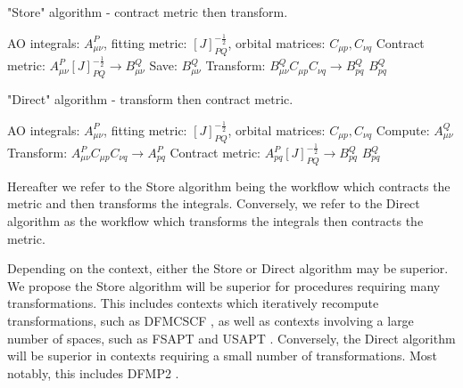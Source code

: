 \begin{algorithm}[H]
\caption{"Store" algorithm - contract metric then transform.}
\begin{algorithmic}
\REQUIRE AO integrals: $A_{\mu \nu}^P$, fitting metric: $[J]_{PQ}^{-\frac{1}{2}}$, orbital matrices: $C_{\mu p}, C_{\nu q}$
\STATE Contract metric: $A_{\mu \nu}^P [J]_{PQ}^{-\frac{1}{2}} \rightarrow B_{\mu \nu}^Q$
\STATE Save: $B_{\mu \nu}^Q$
    \STATE Transform: $B_{\mu \nu}^QC_{\mu p}C_{\nu q} \rightarrow B_{p q}^Q$
\ENDFOR
\RETURN $B_{p q}^Q$
\end{algorithmic}
\end{algorithm}

\begin{algorithm}[H]
\caption{"Direct" algorithm - transform then contract metric.}
\begin{algorithmic}
\REQUIRE AO integrals: $A_{\mu \nu}^P$, fitting metric: $[J]_{PQ}^{-\frac{1}{2}}$, orbital matrices: $C_{\mu p}, C_{\nu q}$
\STATE Compute: $A_{\mu \nu}^Q$
    \STATE Transform: $A_{\mu \nu}^PC_{\mu p}C_{\nu q} \rightarrow A_{p q}^P$
    \STATE Contract metric: $A_{p q}^P [J]_{PQ}^{-\frac{1}{2}} \rightarrow B_{p q}^Q$
\ENDFOR
\RETURN $B_{p q}^Q$
\end{algorithmic}
\end{algorithm}

\noindent Hereafter we refer to the Store algorithm being the workflow which contracts the metric and then transforms the integrals. Conversely, 
we refer to the Direct algorithm as the workflow which transforms the integrals then contracts the metric. 

Depending on the context, either the Store or Direct algorithm may be superior. We propose the Store algorithm 
will be superior for procedures requiring
many transformations. This includes contexts which iteratively recompute transformations, such as DFMCSCF \cite{ref3}, as well as contexts 
involving a large number of spaces, such as FSAPT and USAPT \cite{ref4} \cite{ref5}. 
Conversely, the Direct algorithm will be superior in contexts requiring a small number of transformations. Most notably, 
this includes DFMP2 \cite{ref3}.

%

